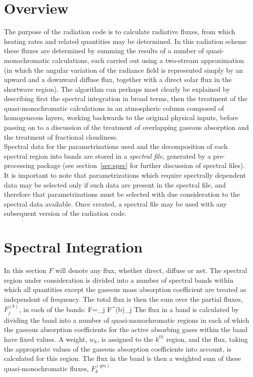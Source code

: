 \section{Overview}

The purpose of the radiation code is to calculate radiative fluxes, 
from which heating rates and related 
quantities may be determined. In this radiation scheme these fluxes are 
determined by summing the 
results of a number of quasi-monochromatic calculations, each carried 
out using a two-stream 
approximation (in which the angular variation of the radiance field is
represented simply by an upward and a downward diffuse flux, together
with a direct solar flux in the shortwave region).
The algorithm can perhaps most clearly be explained by describing first 
the spectral 
integration in broad terms, then the treatment of the 
quasi-monochromatic calculations in an 
atmospheric column composed of homogeneous layers, working backwards to 
the original physical 
inputs, before passing on to a discussion of the treatment of 
overlapping gaseous absorption and the 
treatment of fractional cloudiness. \\

\noindent
Spectral data for the parametrizations used and the decomposition of 
each spectral region into bands 
are stored in a {\em spectral file}, generated by a pre-processing 
package (see section~\ref{sec:spec} for further discussion of spectral files).
It is important to note that parametrizations which require 
spectrally dependent data may be 
selected only if such data are present in the spectral file, and 
therefore that parametrizations must be 
selected with due consideration to the spectral data available. Once 
created, a spectral file may be used 
with any subsequent version of the radiation code.

\section{Spectral Integration}

In this section $F$ will denote any flux, whether direct, diffuse or 
net. The spectral region under 
consideration is divided into a number of spectral bands within which 
all quantities except the gaseous 
mass absorption coefficient are treated as independent of frequency. 
The total flux is then the sum 
over the partial fluxes, $F^{(b)}_{j}$, in each of the bands:
\beq
F=\sum_{j} F^{(b)}_{j}
\label{p2_eq1}
\eeq 
The flux in a band is calculated by dividing the band into a number of 
quasi-monochromatic regions 
in each of which the gaseous absorption coefficients for the active 
absorbing gases within the band 
have fixed values. A weight, $w_{k}$, is assigned to the  $k^{th}$ 
region, and the flux, taking the appropriate 
values of the gaseous absorption coefficients
into account, is calculated for this 
region. The flux in the band is then 
a weighted sum of these quasi-monochromatic fluxes, $F^{(qm)}_{k}$      
        
